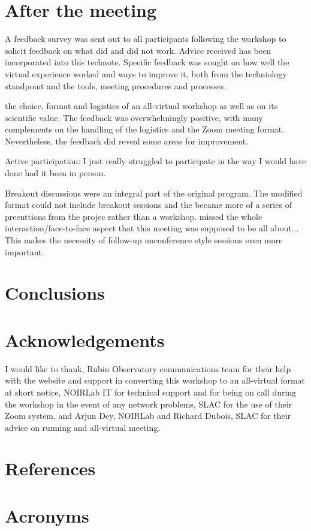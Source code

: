 \documentclass[DM,authoryear,toc]{lsstdoc}
\begin{document}
\section{After the meeting}

A feedback survey was sent out to all participants following the workshop to solicit feedback on what did and did not work.  Advice received has been incorporated into this technote.  Specific feedback was sought on how well the virtual experience worked and ways to improve it, both from the techniology standpoint and the tools, meeting procedures and processes. 

 the choice, format and logistics of an all-virtual workshop as well as on its scientific value. The feedback was overwhelmingly positive, with many complements on the handling of the logistics and the Zoom meeting format. Nevertheless, the feedback did reveal some areas for improvement. 

Active participation:  I just really struggled to participate in the way I would have done had it been in person.

Breakout discussions were an integral part of the original program. The modified format could not include breakout sessions and the became more of a series of preenttions from the projec  rather than a workshop.  missed the whole interaction/face-to-face aspect that this meeting was supposed to be all about... This makes the necessity of follow-up unconference style sessions even more important. 


\section{Conclusions}


\section{Acknowledgements}
I would like to thank, Rubin Observatory communications team for their help with the website and support in converting this workshop to an all-virtual format at short notice,  NOIRLab IT for technical support and for being on call during the workshop in the event of any network problems, SLAC for the use of their Zoom system, and Arjun Dey, NOIRLab and Richard Dubois, SLAC for their advice on running and all-virtual meeting.

\appendix
\section{References} 
\label{sec:bib}


\section{Acronyms} \label{sec:acronyms}

\printglossaries
\end{document}
